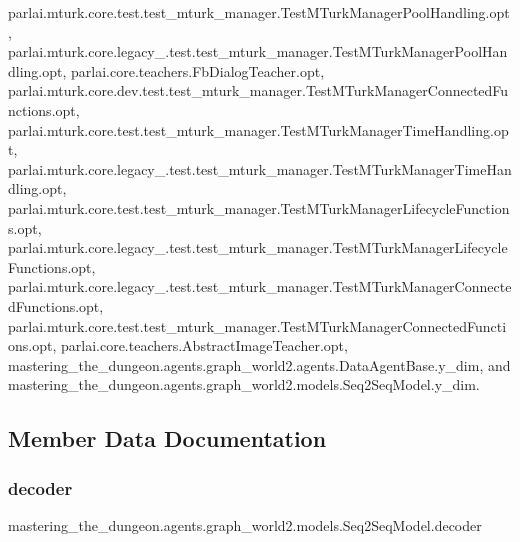 parlai.\+mturk.\+core.\+test.\+test\+\_\+mturk\+\_\+manager.\+Test\+M\+Turk\+Manager\+Pool\+Handling.\+opt, parlai.\+mturk.\+core.\+legacy\+\_.\+test.\+test\+\_\+mturk\+\_\+manager.\+Test\+M\+Turk\+Manager\+Pool\+Handling.\+opt, parlai.\+core.\+teachers.\+Fb\+Dialog\+Teacher.\+opt, parlai.\+mturk.\+core.\+dev.\+test.\+test\+\_\+mturk\+\_\+manager.\+Test\+M\+Turk\+Manager\+Connected\+Functions.\+opt, parlai.\+mturk.\+core.\+test.\+test\+\_\+mturk\+\_\+manager.\+Test\+M\+Turk\+Manager\+Time\+Handling.\+opt, parlai.\+mturk.\+core.\+legacy\+\_.\+test.\+test\+\_\+mturk\+\_\+manager.\+Test\+M\+Turk\+Manager\+Time\+Handling.\+opt, parlai.\+mturk.\+core.\+test.\+test\+\_\+mturk\+\_\+manager.\+Test\+M\+Turk\+Manager\+Lifecycle\+Functions.\+opt, parlai.\+mturk.\+core.\+legacy\+\_.\+test.\+test\+\_\+mturk\+\_\+manager.\+Test\+M\+Turk\+Manager\+Lifecycle\+Functions.\+opt, parlai.\+mturk.\+core.\+legacy\+\_.\+test.\+test\+\_\+mturk\+\_\+manager.\+Test\+M\+Turk\+Manager\+Connected\+Functions.\+opt, parlai.\+mturk.\+core.\+test.\+test\+\_\+mturk\+\_\+manager.\+Test\+M\+Turk\+Manager\+Connected\+Functions.\+opt, parlai.\+core.\+teachers.\+Abstract\+Image\+Teacher.\+opt, mastering\+\_\+the\+\_\+dungeon.\+agents.\+graph\+\_\+world2.\+agents.\+Data\+Agent\+Base.\+y\+\_\+dim, and mastering\+\_\+the\+\_\+dungeon.\+agents.\+graph\+\_\+world2.\+models.\+Seq2\+Seq\+Model.\+y\+\_\+dim.



\subsection{Member Data Documentation}
\mbox{\label{classmastering__the__dungeon_1_1agents_1_1graph__world2_1_1models_1_1Seq2SeqModel_aef8ffba183519efaeb731bf05b838bf8}} 
\subsubsection{\texorpdfstring{decoder}{decoder}}
{\footnotesize\ttfamily mastering\+\_\+the\+\_\+dungeon.\+agents.\+graph\+\_\+world2.\+models.\+Seq2\+Seq\+Model.\+decoder}



